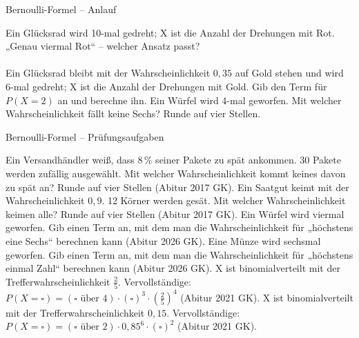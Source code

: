 \begin{aufgabe}{Bernoulli-Formel – Anlauf}
\begin{teile}
\teil Ein Glücksrad wird 10-mal gedreht; X ist die Anzahl der Drehungen mit Rot. „Genau viermal Rot“ – welcher Ansatz passt?  \\  \\ 
\teil Ein Glücksrad bleibt mit der Wahrscheinlichkeit $0{,}35$ auf Gold stehen und wird 6-mal gedreht; X ist die Anzahl der Drehungen mit Gold. Gib den Term für $P(X = 2)$ an und berechne ihn.
\teil Ein Würfel wird 4-mal geworfen. Mit welcher Wahrscheinlichkeit fällt keine Sechs? Runde auf vier Stellen. \leerfeld
\end{teile}
\end{aufgabe}

\begin{aufgabe}{Bernoulli-Formel – Prüfungsaufgaben}
\begin{teile}
\teil Ein Versandhändler weiß, dass 8\,\% seiner Pakete zu spät ankommen. 30 Pakete werden zufällig ausgewählt. Mit welcher Wahrscheinlichkeit kommt keines davon zu spät an? Runde auf vier Stellen \hfill (Abitur 2017 GK). \leerfeld
\teil Ein Saatgut keimt mit der Wahrscheinlichkeit $0{,}9$. 12 Körner werden gesät. Mit welcher Wahrscheinlichkeit keimen alle? Runde auf vier Stellen \hfill (Abitur 2017 GK). \leerfeld
\teil Ein Würfel wird viermal geworfen. Gib einen Term an, mit dem man die Wahrscheinlichkeit für „höchstens eine Sechs“ berechnen kann \hfill (Abitur 2026 GK).
\teil Eine Münze wird sechsmal geworfen. Gib einen Term an, mit dem man die Wahrscheinlichkeit für „höchstens einmal Zahl“ berechnen kann \hfill (Abitur 2026 GK).
\teil X ist binomialverteilt mit der Trefferwahrscheinlichkeit $\frac{2}{5}$. Vervollständige: $P(X = \square) = (\square \text{ über } 4) \cdot (\square)^3 \cdot \left(\frac{2}{5}\right)^4$ \hfill (Abitur 2021 GK).
\teil X ist binomialverteilt mit der Trefferwahrscheinlichkeit $0{,}15$. Vervollständige: $P(X = \square) = (\square \text{ über } 2) \cdot 0{,}85^6 \cdot (\square)^2$ \hfill (Abitur 2021 GK).
\end{teile}
\end{aufgabe}

